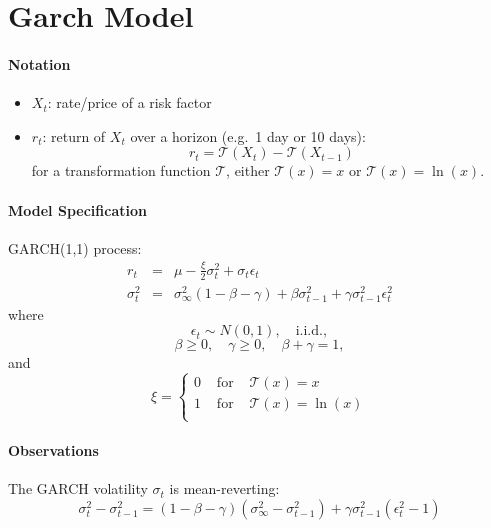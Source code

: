 \documentclass[10pt,a4paper]{article}
\newcommand{\Trans}{\mathcal{T}}
\begin{document}
	
\section{Garch Model}

\paragraph{Notation}
\begin{itemize}
	\item $X_t$: rate/price of a risk factor
	\item $r_t$: return of $X_t$ over a horizon (e.g.\ 1 day or 10 days):
	\begin{equation}
	r_t = \Trans(X_t) - \Trans(X_{t-1})
	\end{equation}
	for a transformation function $\Trans$, either $\Trans(x) = x$ or $\Trans(x) = \ln(x)$. 
\end{itemize}

\paragraph{Model Specification}

GARCH(1,1) process:
\begin{eqnarray}
r_t & = & \mu - \frac{\xi}{2}\sigma_t^2 + \sigma_t\epsilon_t \\
\sigma_t^2 & = & \sigma_\infty^2(1-\beta-\gamma) + \beta \sigma_{t-1}^{2} + \gamma \sigma_{t-1}^{2}\epsilon_t^2
\end{eqnarray}
where
\begin{equation}
\epsilon_t \sim N(0,1), \quad \textrm{i.i.d.},
\end{equation}
\begin{equation}
\beta \ge 0, \quad \gamma \ge 0, \quad \beta+\gamma = 1,
\end{equation}
and 
\begin{equation}
\xi = \left\{
\begin{array}{ccl}
0 & \textrm{ for } & \Trans(x) = x \\
1 & \textrm{ for } & \Trans(x) = \ln(x) \\
\end{array}
\right.
\end{equation}

\paragraph{Observations}

The GARCH volatility $\sigma_t$ is mean-reverting:
\begin{equation}
\sigma_t^2 - \sigma_{t-1}^2 = (1-\beta-\gamma)(\sigma_\infty^2 - \sigma_{t-1}^2) + \gamma \sigma_{t-1}^2 (\epsilon_{t}^2 - 1)
\end{equation}
\end{document}
